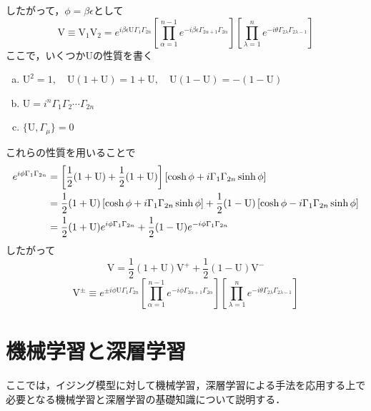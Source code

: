 \documentclass[a4paper,11pt]{jsreport}
\begin{document}
したがって，$\phi = \beta \epsilon$として
\begin{equation}
  \mathrm{V} \equiv \mathrm{V}_1 \mathrm{V}_2
  = e^{i \beta \epsilon \mathrm{U} \Gamma_1 \Gamma_{2n}}\left[ \prod_{\alpha=1}^{n-1} e^{-i \beta \epsilon \Gamma_{2\alpha+1} \Gamma_{2\alpha}} \right] \left[ \prod_{\lambda=1}^{n} e^{-i \theta \Gamma_{2\lambda} \Gamma_{2\lambda-1}} \right]
\end{equation}
ここで，いくつか$\mathrm{U}$の性質を書く
\begin{enumerate}[(a)]
  \item $\mathrm{U}^2 = 1, \quad \mathrm{U}(1 + \mathrm{U}) = 1 + \mathrm{U}, \quad \mathrm{U}(1 - \mathrm{U}) = -(1 - \mathrm{U})$
  \item $\mathrm{U} = i^n \Gamma_1 \Gamma_2 \cdots \Gamma_{2n}$
  \item $\{\mathrm{U}, \Gamma_{\mu}\} = 0$
\end{enumerate}
これらの性質を用いることで
\begin{align}
  e^{i \phi \Gamma_1 \Gamma_{2n}}
  &= \left[\frac{1}{2} (1 + \mathrm{U}) + \frac{1}{2} (1 + \mathrm{U})\right]\left[\cosh{\phi} + i \Gamma_1 \Gamma_{2n} \sinh{\phi}\right]
  \notag \\
  &= \frac{1}{2} (1 + \mathrm{U})\left[\cosh{\phi} + i \Gamma_1 \Gamma_{2n} \sinh{\phi}\right]
  + \frac{1}{2} (1 - \mathrm{U})\left[\cosh{\phi} - i \Gamma_1 \Gamma_{2n} \sinh{\phi}\right] \notag \\
  &= \frac{1}{2} (1 + \mathrm{U}) e^{i \phi \Gamma_1 \Gamma_{2n}}
  + \frac{1}{2} (1 - \mathrm{U}) e^{-i \phi \Gamma_1 \Gamma_{2n}}
\end{align}
したがって
\begin{equation}
  \mathrm{V} 
  = \frac{1}{2} (1 + \mathrm{U}) \mathrm{V}^+
  + \frac{1}{2} (1 - \mathrm{U}) \mathrm{V}^-
\end{equation}
\begin{equation}
  \mathrm{V}^{\pm}
  \equiv e^{\pm i \phi \mathrm{U} \Gamma_1 \Gamma_{2n}}\left[ \prod_{\alpha=1}^{n-1} e^{-i \phi \Gamma_{2\alpha+1} \Gamma_{2\alpha}} \right] \left[ \prod_{\lambda=1}^{n} e^{-i \theta \Gamma_{2\lambda} \Gamma_{2\lambda-1}} \right]
\end{equation}

\chapter{機械学習と深層学習}
ここでは，イジング模型に対して機械学習，深層学習による手法を応用する上で必要となる機械学習と深層学習の基礎知識について説明する．
\end{document}
